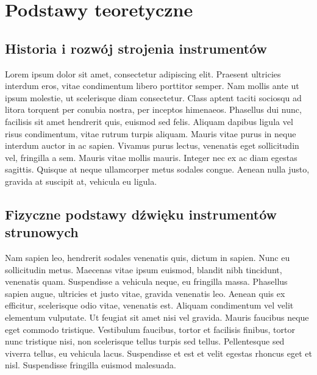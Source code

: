 
\setlength{\parindent}{1.25cm} %

\section{Podstawy teoretyczne}

\subsection{Historia i rozwój strojenia instrumentów}
\begin{spacing}{1.5} %
    Lorem ipsum dolor sit amet, consectetur adipiscing elit. Praesent ultricies interdum eros, vitae condimentum libero porttitor semper. Nam mollis ante ut ipsum molestie, ut scelerisque diam consectetur. Class aptent taciti sociosqu ad litora torquent per conubia nostra, per inceptos himenaeos. Phasellus dui nunc, facilisis sit amet hendrerit quis, euismod sed felis. Aliquam dapibus ligula vel risus condimentum, vitae rutrum turpis aliquam. Mauris vitae purus in neque interdum auctor in ac sapien. Vivamus purus lectus, venenatis eget sollicitudin vel, fringilla a sem. Mauris vitae mollis mauris. Integer nec ex ac diam egestas sagittis. Quisque at neque ullamcorper metus sodales congue. Aenean nulla justo, gravida at suscipit at, vehicula eu ligula. 
\end{spacing} %

\subsection{Fizyczne podstawy dźwięku instrumentów strunowych}
\begin{spacing}{1.5} %
    Nam sapien leo, hendrerit sodales venenatis quis, dictum in sapien. Nunc eu sollicitudin metus. Maecenas vitae ipsum euismod, blandit nibh tincidunt, venenatis quam. Suspendisse a vehicula neque, eu fringilla massa. Phasellus sapien augue, ultricies et justo vitae, gravida venenatis leo. Aenean quis ex efficitur, scelerisque odio vitae, venenatis est. Aliquam condimentum vel velit elementum vulputate. Ut feugiat sit amet nisi vel gravida. Mauris faucibus neque eget commodo tristique. Vestibulum faucibus, tortor et facilisis finibus, tortor nunc tristique nisi, non scelerisque tellus turpis sed tellus. Pellentesque sed viverra tellus, eu vehicula lacus. Suspendisse et est et velit egestas rhoncus eget et nisl. Suspendisse fringilla euismod malesuada. 
\end{spacing} %

